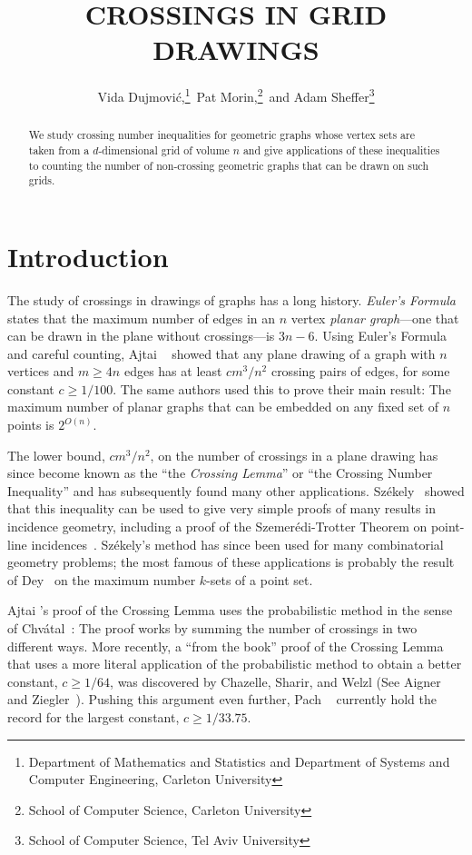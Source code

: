 \documentclass{patmorin}
\title{\MakeUppercase{Crossings in Grid Drawings}}
\author{%
  Vida Dujmovi\'c,\thanks{Department of Mathematics and Statistics
       and Department of Systems and Computer Engineering, 
       Carleton University}\, 
  Pat Morin,\thanks{School of Computer Science, Carleton University}\, and 
  Adam Sheffer\thanks{School of Computer Science, Tel Aviv University}}
\begin{document}
\begin{titlepage}
\maketitle
{}

\begin{abstract}
   We study crossing number inequalities for geometric graphs whose
   vertex sets are taken from a $d$-dimensional grid of volume $n$
   and give applications of these inequalities to counting the number
   of non-crossing geometric graphs that can be drawn on such grids.
\end{abstract}
\end{titlepage}

\section{Introduction}

The study of crossings in drawings of graphs has a long history.
\emph{Euler's Formula} states that the maximum number of edges in an $n$
vertex \emph{planar graph}---one that can be drawn in the plane without
crossings---is $3n-6$.  Using Euler's Formula and careful counting, Ajtai
\etal~\cite{ajtai.chvatal.ea:crossing-free} showed that any plane drawing
of a graph with $n$ vertices and $m\ge 4n$ edges has at least $c m^3/n^2$
crossing pairs of edges, for some constant $c\ge 1/100$.  The same authors
used this to prove their main result: The maximum number of planar graphs
that can be embedded on any fixed set of $n$ points is $2^{O(n)}$.

The lower bound, $cm^3/n^2$, on the number of crossings in a plane
drawing has since become known as the ``the \emph{Crossing Lemma}''
or ``the Crossing Number Inequality'' and has subsequently found many
other applications.  Sz\'ekely~\cite{szekely:crossing} showed that
this inequality can be used to give very simple proofs of many results
in incidence geometry, including a proof of the Szemer\'edi-Trotter
Theorem on point-line incidences~\cite{szemeredi.trotter:extremal}.
Sz\'ekely's method has since been used for many combinatorial geometry
problems; the most famous of these applications is probably the result
of Dey~\cite{dey:improved} on the maximum number $k$-sets of a point set.

Ajtai \etal's proof of the Crossing Lemma uses the probabilistic method
in the sense of Chv\'atal~\cite{chvatal:hypergraphs}: The proof works by
summing the number of crossings in two different ways.  More recently, a
``from the book'' proof of the Crossing Lemma that uses a more literal
application of the probabilistic method to obtain a better constant,
$c\ge 1/64$, was discovered by Chazelle, Sharir, and Welzl (See Aigner
and Ziegler~\cite[Chapter~30, Theorem~4]{aigner.ziegler:proofs}).  Pushing
this argument even further, Pach \etal~\cite{pach.radoicic.ea:improving}
currently hold the record for the largest constant, $c\ge 1/33.75$.
\end{document}
